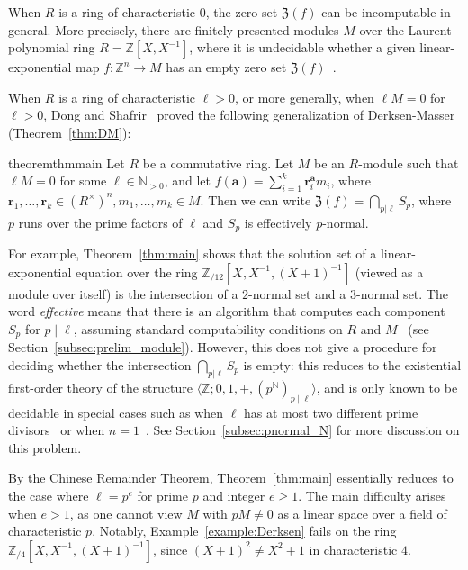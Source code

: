 \documentclass[letterpaper, 11pt, thm-restate]{article}
\numberwithin{equation}{section}
\newcommand{\Z}{\mathbb{Z}}
\newcommand{\N}{\mathbb{N}}
\newcommand{\mZ}{\mathfrak{Z}}
\newcommand{\ba}{\boldsymbol{a}}
\newcommand{\br}{\boldsymbol{r}}
\newcommand{\gen}[1]{\langle {#1} \rangle}
\theoremstyle{definition}
\theoremstyle{definition}
\theoremstyle{definition}
\begin{document}
When $R$ is a ring of characteristic $0$, the zero set $\mZ(f)$ can be incomputable in general.
More precisely, there are finitely presented modules $M$ over the Laurent polynomial ring $R = \Z[X, X^{-1}]$, where it is undecidable whether a given linear-exponential map $f\colon \Z^n \rightarrow M$ has an empty zero set $\mZ(f)$~\cite{Dong2025LinearEW}.

When $R$ is a ring of characteristic $\ell > 0$, or more generally, when $\ell M = 0$ for $\ell > 0$, Dong and Shafrir~\cite{dong2025s} proved the following generalization of Derksen-Masser (Theorem~\ref{thm:DM}):

\begin{restatable}{theorem}{thmmain}\label{thm:main}
    Let $R$ be a commutative ring.
    Let $M$ be an $R$-module such that $\ell M=0$ for some $\ell \in\N_{>0}$, and let $f(\ba)=\sum_{i = 1}^k\br_i^{\ba} m_i$, where $\br_1,\ldots,\br_k\in (R^{\times})^n, m_1,\ldots,m_k\in M$.
    Then we can write $\mZ(f) = \bigcap_{p|\ell}S_p$, where $p$ runs over the prime factors of $\ell$ and $S_p$ is effectively $p$-normal.
\end{restatable}

For example, Theorem~\ref{thm:main} shows that the solution set of a linear-exponential equation over the ring $\Z_{/12}[X, X^{-1}, (X+1)^{-1}]$ (viewed as a module over itself) is the intersection of a $2$-normal set and a $3$-normal set.
The word \emph{effective} means that there is an algorithm that computes each component $S_p$ for $p \mid \ell$, assuming standard computability conditions on $R$ and $M$~\cite{baumslag1981computable} (see Section~\ref{subsec:prelim_module}).
However, this does not give a procedure for deciding whether the intersection $\bigcap_{p|\ell}S_p$ is empty: 
this reduces to the existential first-order theory of the structure $\gen{\Z; 0, 1, +, \left(p^{\N}\right)_{p \mid \ell}}$, and is only known to be decidable in special cases such as when $\ell$ has at most two different prime divisors~\cite{karimov2025decidability} or when $n=1$~\cite{dong2025skolemproblemringspositive}.
See Section~\ref{subsec:pnormal_N} for more discussion on this problem.

By the Chinese Remainder Theorem, Theorem~\ref{thm:main} essentially reduces to the case where $\ell = p^e$ for prime $p$ and integer $e \geq 1$.
The main difficulty arises when $e > 1$, as one cannot view $M$ with $pM \neq 0$ as a linear space over a field of characteristic $p$.
Notably, Example~\ref{example:Derksen} fails on the ring $\Z_{/4}[X, X^{-1}, (X+1)^{-1}]$, since $(X+1)^2 \neq X^2+1$ in characteristic $4$.
\end{document}
